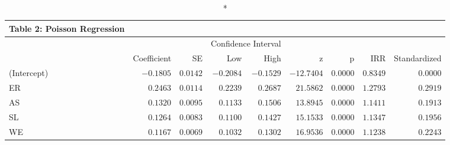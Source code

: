 \begin{longtable}{l|rrrrrrrr}
\caption*{
{\large Table 2: Poisson Regression}
} \\ 
\toprule
\multicolumn{1}{l}{} &  &  & \multicolumn{2}{c}{Confidence Interval} &  &  &  &  \\ 
\cmidrule(lr){4-5}
\multicolumn{1}{l}{} & Coefficient & SE & Low & High & z & p & IRR & Standardized \\ 
\midrule
(Intercept) & $-0.1805$ & $0.0142$ & $-0.2084$ & $-0.1529$ & $-12.7404$ & $0.0000$ & $0.8349$ & $0.0000$ \\ 
ER & $0.2463$ & $0.0114$ & $0.2239$ & $0.2687$ & $21.5862$ & $0.0000$ & $1.2793$ & $0.2919$ \\ 
AS & $0.1320$ & $0.0095$ & $0.1133$ & $0.1506$ & $13.8945$ & $0.0000$ & $1.1411$ & $0.1913$ \\ 
SL & $0.1264$ & $0.0083$ & $0.1100$ & $0.1427$ & $15.1533$ & $0.0000$ & $1.1347$ & $0.1956$ \\ 
WE & $0.1167$ & $0.0069$ & $0.1032$ & $0.1302$ & $16.9536$ & $0.0000$ & $1.1238$ & $0.2243$ \\ 
\bottomrule
\end{longtable}

